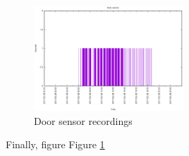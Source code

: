 \documentclass{below-ext}
\begin{document}
\begin{figure}
\centering
\label{fig:doorsensor}
\includegraphics[width=0.5\textwidth]{doorsensor}
\caption{Door sensor recordings}
\end{figure}

Finally, figure Figure \ref{fig:doorsensor} 



\end{document}
